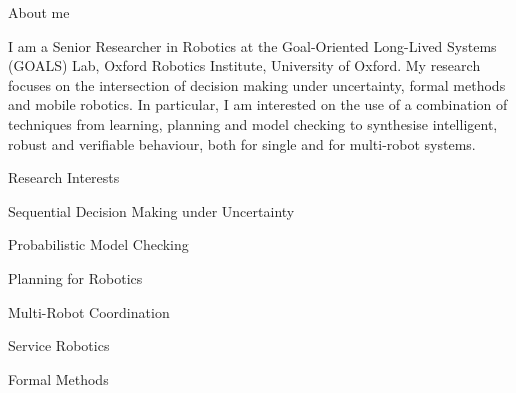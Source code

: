 
\begin{rSection}{About me}

I am a Senior Researcher in Robotics at the  Goal-Oriented Long-Lived Systems (GOALS) Lab, Oxford Robotics Institute, University of Oxford.
%
My research focuses on the intersection of decision making under uncertainty, formal methods and mobile robotics.
%
In particular, I am interested on the use of a combination of techniques from learning, planning and model checking to synthesise intelligent, robust and verifiable behaviour, both  for single and for multi-robot systems.


\begin{rSubsection}{Research Interests	}{}{}{}
\item Sequential Decision Making under Uncertainty
\item Probabilistic Model Checking
\item Planning for Robotics
\item Multi-Robot Coordination
\item Service Robotics
\item Formal Methods
\end{rSubsection}





\end{rSection}

